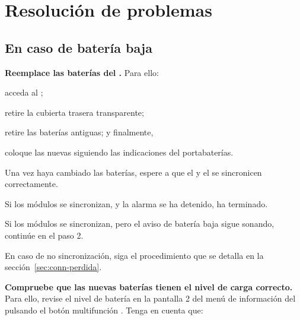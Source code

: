 \section{Resolución de problemas}
\label{sec:resolucion-problemas}

\subsection{En caso de batería baja}
\label{sec:bateria-baja}

\begin{enumeratecompact}

\item \textbf{Reemplace las baterías del \MEE.} Para ello:

\begin{itemizecompact}

\item acceda al \MEE; 
\item retire la cubierta trasera transparente;
\item retire las baterías antiguas; y finalmente,
\item coloque las nuevas siguiendo las indicaciones del portabaterías. 

\end{itemizecompact}

Una vez haya cambiado las baterías, espere a que el \MIE y el \MIE se sincronicen correctamente.  

\begin{itemizecompact}

\item Si los módulos se sincronizan, y la alarma se ha detenido, ha terminado.

\item Si los módulos se sincronizan, pero el aviso de batería baja sigue sonando, continúe en el paso 2.

\item En caso de no sincronización, siga el procedimiento que se detalla en la sección~\ref{sec:conn-perdida}.

\end{itemizecompact}

\item \textbf{Compruebe que las nuevas baterías tienen el nivel de carga correcto.} Para ello, revise el nivel de batería en la pantalla 2 del menú de información del \MIE pulsando el botón multifunción . Tenga en cuenta que:

\begin{itemizecompact}


\end{itemizecompact}
\end{enumeratecompact}

